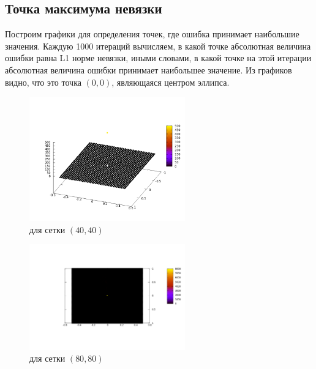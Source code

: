 \documentclass[oneside,final,14pt]{extreport}
\begin{document}
\subsection{Точка максимума невязки}
\noindent
Построим графики для определения точек, где ошибка принимает наибольшие
значения. Каждую 1000 итераций вычисляем, в какой точке абсолютная
величина ошибки равна L1 норме невязки, иными словами, в какой точке
на этой итерации абсолютная величина ошибки принимает наибольшее значение.
Из графиков видно, что это точка \((0,0)\), являющаяся центром эллипса.
\begin{figure}[ht!]
  \centering
  \includegraphics[width=0.6\textwidth]{picture8}
  \caption{для сетки \((40, 40)\)}
\end{figure}

\begin{figure}[h!]
  \centering
  \includegraphics[width=0.6\textwidth]{picture9}
  \caption{для сетки \((80, 80)\)}
\end{figure}

\newpage
\end{document}
